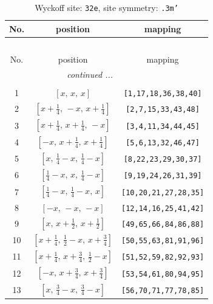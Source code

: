 \documentclass[fleqn,8pt]{jsarticle}
\begin{document}
\begin{longtable}{ccc}
\caption{Wyckoff site: {\tt 32e}, site symmetry: {\tt .3m'}}
 \\
 \hline \hline
No. & position & mapping \\ \hline \endfirsthead

\multicolumn{2}{l}{\tablename\ \thetable{}} \\
 \hline \hline
No. & position & mapping \\ \hline \endhead

 \hline \hline
\multicolumn{2}{r}{\footnotesize\it continued ...} \\ \endfoot

 \hline \hline
\multicolumn{2}{r}{} \\ \endlastfoot

1 & $\left[ x,\, x,\, x \right]$ & {\tt [1,17,18,36,38,40]} \\ \hline
2 & $\left[ x + \frac{1}{4},\, - x,\, x + \frac{1}{4} \right]$ & {\tt [2,7,15,33,43,48]} \\ \hline
3 & $\left[ x + \frac{1}{4},\, x + \frac{1}{4},\, - x \right]$ & {\tt [3,4,11,34,44,45]} \\ \hline
4 & $\left[ - x,\, x + \frac{1}{4},\, x + \frac{1}{4} \right]$ & {\tt [5,6,13,32,46,47]} \\ \hline
5 & $\left[ x,\, \frac{1}{4} - x,\, \frac{1}{4} - x \right]$ & {\tt [8,22,23,29,30,37]} \\ \hline
6 & $\left[ \frac{1}{4} - x,\, x,\, \frac{1}{4} - x \right]$ & {\tt [9,19,24,26,31,39]} \\ \hline
7 & $\left[ \frac{1}{4} - x,\, \frac{1}{4} - x,\, x \right]$ & {\tt [10,20,21,27,28,35]} \\ \hline
8 & $\left[ - x,\, - x,\, - x \right]$ & {\tt [12,14,16,25,41,42]} \\ \hline
9 & $\left[ x,\, x + \frac{1}{2},\, x + \frac{1}{2} \right]$ & {\tt [49,65,66,84,86,88]} \\ \hline
10 & $\left[ x + \frac{1}{4},\, \frac{1}{2} - x,\, x + \frac{3}{4} \right]$ & {\tt [50,55,63,81,91,96]} \\ \hline
11 & $\left[ x + \frac{1}{4},\, x + \frac{3}{4},\, \frac{1}{2} - x \right]$ & {\tt [51,52,59,82,92,93]} \\ \hline
12 & $\left[ - x,\, x + \frac{3}{4},\, x + \frac{3}{4} \right]$ & {\tt [53,54,61,80,94,95]} \\ \hline
13 & $\left[ x,\, \frac{3}{4} - x,\, \frac{3}{4} - x \right]$ & {\tt [56,70,71,77,78,85]} \\ \hline

\end{longtable}
\end{document}

